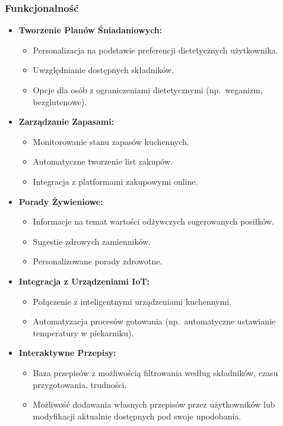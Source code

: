 \documentclass[a4paper,12pt]{article}
\begin{document}
\subsubsection{Funkcjonalność}
\begin{itemize}
    \item \textbf{Tworzenie Planów Śniadaniowych:}
    \begin{itemize}
        \item Personalizacja na podstawie preferencji dietetycznych użytkownika.
        \item Uwzględnianie dostępnych składników.
        \item Opcje dla osób z ograniczeniami dietetycznymi (np.\ weganizm, bezglutenowe).
    \end{itemize}
    \item \textbf{Zarządzanie Zapasami:}
    \begin{itemize}
        \item Monitorowanie stanu zapasów kuchennych.
        \item Automatyczne tworzenie list zakupów.
        \item Integracja z platformami zakupowymi online.
    \end{itemize}
    \item \textbf{Porady Żywieniowe:}
    \begin{itemize}
        \item Informacje na temat wartości odżywczych sugerowanych posiłków.
        \item Sugestie zdrowych zamienników.
        \item Personalizowane porady zdrowotne.
    \end{itemize}
    \item \textbf{Integracja z Urządzeniami IoT:}
    \begin{itemize}
        \item Połączenie z inteligentnymi urządzeniami kuchennymi.
        \item Automatyzacja procesów gotowania (np.\ automatyczne ustawianie temperatury w piekarniku).
    \end{itemize}
    \item \textbf{Interaktywne Przepisy:}
    \begin{itemize}
        \item Baza przepisów z możliwością filtrowania według składników, czasu przygotowania, trudności.
        \item Możliwość dodawania własnych przepisów przez użytkowników lub modyfikacji aktualnie dostępnych pod swoje upodobania.

\end{itemize}
\end{itemize}
\end{document}
